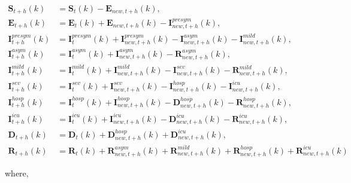 \documentclass{article}
\begin{document}
\begin{align*}
\textbf{S}_{t+h} (k) & = \textbf{S}_{t} (k) - \textbf{E}_{new, t+h}(k),\\
%
\textbf{E}_{t+h}(k) & = \textbf{E}_{t}(k) + \textbf{E}_{new, t+h}(k) - \textbf{I}^{presym}_{new, t + h} (k),\\
%
\textbf{I}^{presym}_{t+h}(k) & = \textbf{I}^{presym}_{t}(k) + \textbf{I}^{presym}_{new, t + h}(k) - \textbf{I}^{asym}_{new, t + h}(k) - \textbf{I}^{mild}_{new, t + h}(k),\\
%
\textbf{I}^{asym}_{t+h}(k) & = \textbf{I}^{asym}_{t}(k) + \textbf{I}^{asym}_{new, t + h}(k) - \textbf{R}^{asym}_{new, t + h}(k),\\
%
\textbf{I}^{mild}_{t+h}(k) & = \textbf{I}^{mild}_{t}(k) + \textbf{I}^{mild}_{new, t + h}(k) - \textbf{I}^{sev}_{new, t + h}(k) - \textbf{R}^{mild}_{new, t + h}(k),\\
%
\textbf{I}^{sev}_{t+h}(k) & = \textbf{I}^{sev}_{t}(k) + \textbf{I}^{sev}_{new, t + h}(k) - \textbf{I}^{hosp}_{new, t + h}(k) - \textbf{I}^{icu}_{new, t + h}(k),\\
%
\textbf{I}^{hosp}_{t+h}(k) & = \textbf{I}^{hosp}_{t}(k) + \textbf{I}^{hosp}_{new, t + h}(k) - \textbf{D}^{hosp}_{new, t + h}(k) - \textbf{R}^{hosp}_{new, t + h}(k),\\
%
\textbf{I}^{icu}_{t+h}(k) & = \textbf{I}^{icu}_{t}(k) + \textbf{I}^{icu}_{new, t + h}(k) - \textbf{D}^{icu}_{new, t + h}(k) - \textbf{R}^{icu}_{new, t + h}(k),\\
%
\textbf{D}_{t+h}(k) & = \textbf{D}_{t}(k) + \textbf{D}^{hosp}_{new, t + h}(k) + \textbf{D}^{icu}_{new, t + h}(k),\\
%
\textbf{R}_{t+h}(k) & = \textbf{R}_{t}(k) + \textbf{R}^{asym}_{new, t + h}(k) + \textbf{R}^{mild}_{new, t + h}(k) + \textbf{R}^{hosp}_{new, t + h}(k) + \textbf{R}^{icu}_{new, t + h}(k)
\end{align*}

where,
\end{document}

